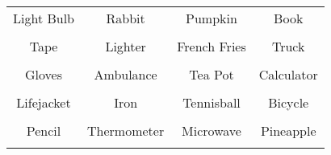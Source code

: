 \documentclass[12pt,a4paper]{article}
\begin{document}
\thispagestyle{empty}
\begin{table}[]
\centering
\Huge
\begin{tabular}{cccc}
 Light Bulb& Rabbit& Pumpkin& Book\\  & & & \\
 Tape& Lighter& French Fries& Truck\\  & & & \\
 Gloves& Ambulance& Tea Pot& Calculator\\  & & & \\
 Lifejacket& Iron& Tennisball& Bicycle\\  & & & \\
 Pencil& Thermometer& Microwave& Pineapple\\  & & & \\
\end{tabular}
\end{table}
\end{document}

